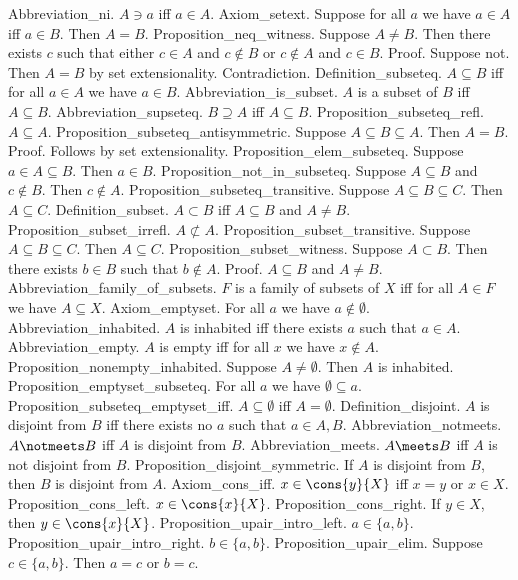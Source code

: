 Abbreviation_ni. $A \ni a$ iff $a \in A$.
Axiom_setext. Suppose for all $a$ we have $a \in A$ iff $a \in B$. Then $A = B$.
Proposition_neq_witness. Suppose $A \neq B$. Then there exists $c$ such that either $c \in A$ and $c \not \in B$ or $c \not \in A$ and $c \in B$.
Proof. Suppose not. Then $A = B$ by set extensionality. Contradiction.
Definition_subseteq. $A \subseteq B$ iff for all $a \in A$ we have $a \in B$.
Abbreviation_is_subset. $A$ is a subset of $B$ iff $A \subseteq B$.
Abbreviation_supseteq. $B \supseteq A$ iff $A \subseteq B$.
Proposition_subseteq_refl. $A \subseteq A$.
Proposition_subseteq_antisymmetric. Suppose $A \subseteq B \subseteq A$. Then $A = B$.
Proof. Follows by set extensionality.
Proposition_elem_subseteq. Suppose $a \in A \subseteq B$. Then $a \in B$.
Proposition_not_in_subseteq. Suppose $A \subseteq B$ and $c \notin B$. Then $c \notin A$.
Proposition_subseteq_transitive. Suppose $A \subseteq B \subseteq C$. Then $A \subseteq C$.
Definition_subset. $A \subset B$ iff $A \subseteq B$ and $A \neq B$.
Proposition_subset_irrefl. $A \not \subset A$.
Proposition_subset_transitive. Suppose $A \subseteq B \subseteq C$. Then $A \subseteq C$.
Proposition_subset_witness. Suppose $A \subset B$. Then there exists $b \in B$ such that $b \notin A$.
Proof. $A \subseteq B$ and $A \neq B$.
Abbreviation_family_of_subsets. $F$ is a family of subsets of $X$ iff for all $A \in F$ we have $A \subseteq X$.
Axiom_emptyset. For all $a$ we have $a \notin \emptyset$.
Abbreviation_inhabited. $A$ is inhabited iff there exists $a$ such that $a \in A$.
Abbreviation_empty. $A$ is empty iff for all $x$ we have $x \notin A$.
Proposition_nonempty_inhabited. Suppose $A \neq \emptyset$. Then $A$ is inhabited.
Proposition_emptyset_subseteq. For all $a$ we have $ \emptyset  \subseteq a$.
Proposition_subseteq_emptyset_iff. $A \subseteq  \emptyset$ iff $A =  \emptyset$.
Definition_disjoint. $A$ is disjoint from $B$ iff there exists no $a$ such that $a \in A, B$.
Abbreviation_notmeets. $A \notmeets B$ iff $A$ is disjoint from $B$.
Abbreviation_meets. $A \meets B$ iff $A$ is not disjoint from $B$.
Proposition_disjoint_symmetric. If $A$ is disjoint from $B$, then $B$ is disjoint from $A$.
Axiom_cons_iff. $x \in  \cons{y}{X}$ iff $x = y$ or $x \in X$.
Proposition_cons_left. $x \in  \cons{x}{X}$.
Proposition_cons_right. If $y \in X$, then $y \in  \cons{x}{X}$.
Proposition_upair_intro_left. $a \in \{a,b \}$.
Proposition_upair_intro_right. $b \in \{a,b \}$.
Proposition_upair_elim. Suppose $c \in \{a,b \}$. Then $a = c$ or $b = c$.
